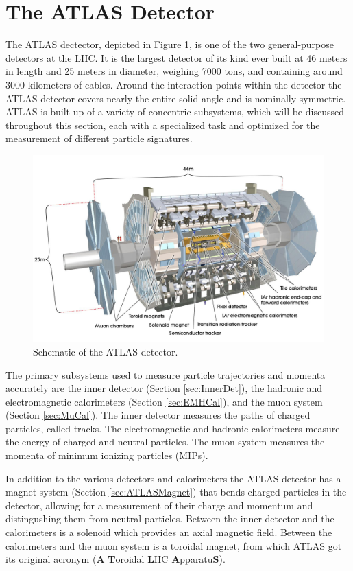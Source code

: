 \section{The ATLAS Detector}
\label{sec:ATLAS}
The ATLAS dectector, depicted in Figure \ref{fig:ATLASOverview}, is one of the two general-purpose detectors at the LHC.  It is the largest detector of its kind ever built at 46 meters in length and 25 meters in diameter, weighing 7000 tons, and containing around 3000 kilometers of cables\cite{ATLAS}.  Around the interaction points within the detector the ATLAS detector covers nearly the entire solid angle and is nominally symmetric.  ATLAS is built up of a variety of concentric subsystems, which will be discussed throughout this section, each with a specialized task and optimized for the measurement of different particle signatures.  
\begin{figure}[ht!]
	\centering
	\includegraphics[width=\columnwidth]{../ThesisImages/LHCImages/AtlasDetector.png}
	\caption[Schematic of the ATLAS detector.]{Schematic of the ATLAS detector\cite{ATLAS}.
	}
	\label{fig:ATLASOverview}
\end{figure}
The primary subsystems used to measure particle trajectories and momenta accurately are the inner detector (Section \ref{sec:InnerDet}), the hadronic and electromagnetic calorimeters (Section \ref{sec:EMHCal}), and the muon system (Section \ref{sec:MuCal}).  The inner detector measures the paths of charged particles, called tracks.  The electromagnetic and hadronic calorimeters measure the energy of charged and neutral particles. The muon system measures the momenta of minimum ionizing particles (MIPs).  

In addition to the various detectors and calorimeters the ATLAS detector has a magnet system (Section \ref{sec:ATLASMagnet}) that bends charged particles in the detector, allowing for a measurement of their charge and momentum and distingushing them from neutral particles.  Between the inner detector and the calorimeters is a solenoid which provides an axial magnetic field.  Between the calorimeters and the muon system is a toroidal magnet, from which ATLAS got its original acronym (\textbf{A} \textbf{T}oroidal \textbf{L}HC \textbf{A}pparatu\textbf{S}).



